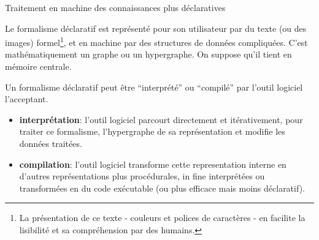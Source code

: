 \documentclass[final,a4,xcolor={svgnames,dvipsnames}]{beamer}
\begin{document}
 \begin{frame}{Traitement en machine des connaissances plus déclaratives}

   Le formalisme déclaratif est représenté pour son utilisateur par du
   texte (ou des images) formel\footnote{La présentation de ce texte -
   couleurs et polices de caractères - en facilite la lisibilité et sa
   compréhension par des humains.}, et en machine par des structures
   de données compliquées. C'est mathématiquement un graphe ou un
   hypergraphe. On suppose qu'il tient en mémoire centrale.
   
   Un formalisme déclaratif peut être ``interprété'' ou ``compilé''
   par l'outil logiciel l'acceptant.

   \begin{itemize}
   \item \textbf{interprétation}: l'outil logiciel parcourt
     directement et itérativement, pour traiter ce formalisme,
     l'hypergraphe de sa représentation et modifie les données
     traitées.
     
   \item \textbf{compilation}: l'outil logiciel transforme cette
     representation interne en d'autres représentations plus
     procédurales, in fine interprétées ou transformées en du code
     exécutable (ou plus efficace mais moins déclaratif).
     
   \end{itemize}
   
 \end{frame}
 
\end{document}
